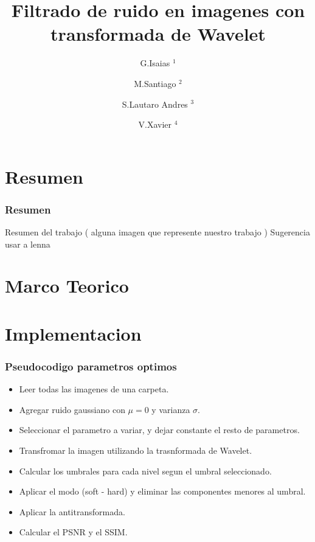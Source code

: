 \documentclass{beamer}
\title{Filtrado de ruido en imagenes con transformada de Wavelet}
\author{
  G.Isaias $^1$ \and   
  M.Santiago $^2$ \and 
  S.Lautaro Andres $^3$ \and
  V.Xavier $^4$ 
}
\institute{
  $^{1-2-3-4}$ Universidad Nacional del Comahue \\ 
  Buenos Aires , Neuquen \\ 
}
\date{}
\begin{document}
    
  \begin{frame}
    \titlepage  
  \end{frame}

  \begin{frame}
    \tableofcontents
  
    
  
  \end{frame}

  \section{Resumen}

  \begin{frame}
    \frametitle{Resumen}
    
    Resumen del trabajo ( alguna imagen que represente nuestro trabajo )
    Sugerencia usar a lenna
  
  \end{frame}

  \section{Marco Teorico}

  \section{Implementacion}

  \begin{frame}
    \frametitle{Pseudocodigo parametros optimos}
  
    \begin{itemize}
      \item Leer todas las imagenes de una carpeta.
      \item Agregar ruido gaussiano con $\mu=0$ y varianza $\sigma$.
      \item Seleccionar el parametro a variar, y dejar constante el resto de parametros.
      \item Transfromar la imagen utilizando la trasnformada de Wavelet.
      \item Calcular los umbrales para cada nivel segun el umbral seleccionado.
      \item Aplicar el modo (soft - hard) y eliminar las componentes menores al umbral.
      \item Aplicar la antitransformada.
      \item Calcular el PSNR y el SSIM.
    \end{itemize}
  
  \end{frame}
\end{document}
